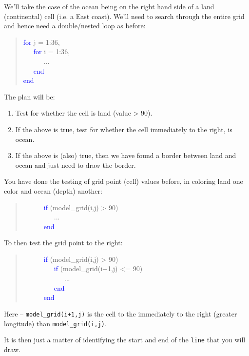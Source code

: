\documentclass{tufte-book} %
\newenvironment{docspec}{\begin{quotation}\ttfamily\parskip0pt\parindent0pt\ignorespaces}{\end{quotation}}
\begin{document}
We'll take the case of the ocean being on the right hand side of a land (continental) cell (i.e. a East coast). We'll need to search through the entire grid and hence need a double/nested loop as before:
\begin{docspec}
\textcolor{blue}{for} j = 1:36,\\
\ \ \ \textcolor{blue}{for} i = 1:36,\\
\ \ \ \ \ \ ...\\
\ \ \ \textcolor{blue}{end}\\
\textcolor{blue}{end}
\end{docspec}
The plan will be:

\begin{enumerate}[noitemsep]
\setlength{\itemindent}{.2in}
\item Test for whether the cell is land (value > 90).
\item If the above is true, test for whether the cell immediately to the right, is ocean.
\item If the above is (also) true, then we have found a border between land and ocean and just need to draw the border.
\end{enumerate}

You have done the testing of grid point (cell) values before, in coloring land one color and ocean (depth) another:
\begin{docspec}
\ \ \ \ \ \ \textcolor{blue}{if} (model\_grid(i,j) > 90)\\
\ \ \ \ \ \ \ \ \ ...\\
\ \ \ \ \ \ \textcolor{blue}{end}
\end{docspec}
To then test the grid point to the right:
\begin{docspec}
\ \ \ \ \ \ \textcolor{blue}{if} (model\_grid(i,j) > 90)\\
\ \ \ \ \ \ \ \ \ \textcolor{blue}{if} (model\_grid(i+1,j) <= 90)\\
\ \ \ \ \ \ \ \ \ \ \ \ ...\\
\ \ \ \ \ \ \ \ \ \textcolor{blue}{end}\\
\ \ \ \ \ \ \textcolor{blue}{end}
\end{docspec}
Here -- \texttt{model\_grid(i+1,j)} is the cell to the immediately to the right (greater longitude) than \texttt{model\_grid(i,j)}.

It is then just a matter of identifying the start and end of the \texttt{line} that you will draw.
\end{document}
